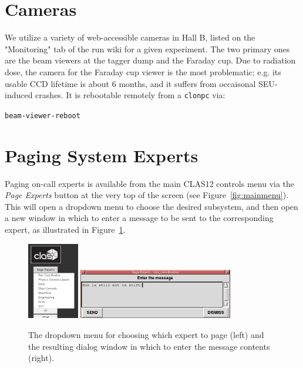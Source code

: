 \documentclass[amsmath,amssymb,notitlepage,11pt]{revtex4}
\begin{document}
\section{Cameras}\label{sec:cameras}
We utilize a variety of web-accessible cameras in Hall B, listed on the "Monitoring" tab of the run wiki for a given experiment.  The two primary ones are the beam viewers at the tagger dump and the Faraday cup.  Due to radiation dose, the camera for the Faraday cup viewer is the most problematic;  e.g. its usable CCD lifetime is about 6 months, and it suffers from occaisonal SEU-induced crashes.  It is rebootable remotely from a \texttt{clonpc} via:

\begin{center}\texttt{beam-viewer-reboot}\end{center}

\section{Paging System Experts}\label{sec:pagingexperts}
Paging on-call experts is available from the main CLAS12 controls menu via the {\em Page Experts} button at the very top of the screen (see Figure~\ref{fig:mainmenu}).  This will open a dropdown menu to choose the desired subsystem, and then open a new window in which to enter a message to be sent to the corresponding expert, as illustrated in Figure~\ref{fig:pageexpert}.
\begin{figure}[htbp]\centering
  \includegraphics[width=0.2\textwidth]{pics/pageexpert}
  \includegraphics[width=0.6\textwidth]{pics/pageexpertmsg}
  \caption{The dropdown menu for choosing which expert to page (left) and the resulting dialog window in which to enter the message contents (right).\label{fig:pageexpert}}
\end{figure}
\end{document}
